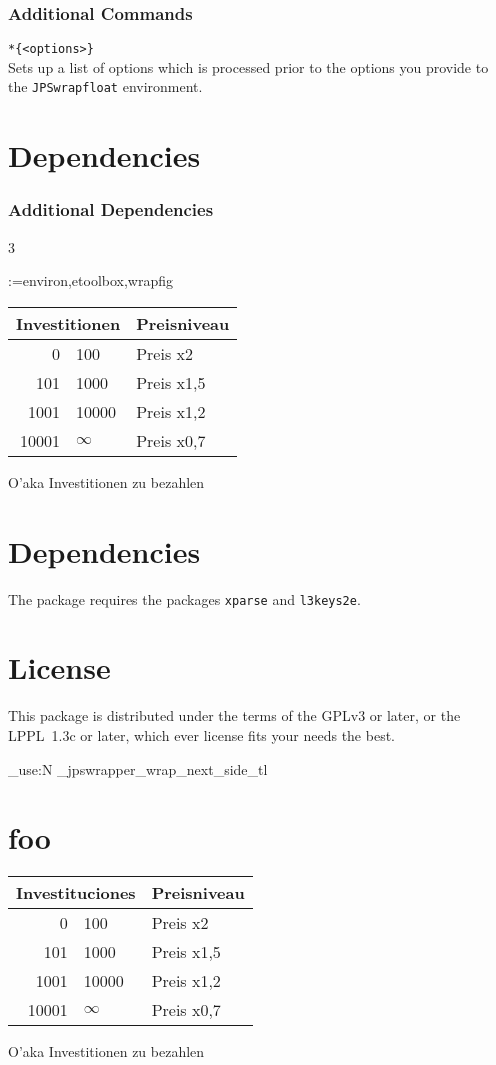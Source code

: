 \documentclass[a4paper,10pt]{scrartcl}
\makeatletter
\newenvironment{codedescription*}{%
  \parindent=-3em
  \parskip=1em plus 2pt minus 2pt
  \vspace*{-0.7em}\hspace*{\parindent}\ignorespaces
}{\par}
\newcommand*\dependencies[2][3]{%
  \@ifstar
    {\section{Dependencies}}
    {\subsubsection{Additional Dependencies}}%
  \begin{multicols}{#1}
    \begin{itemize}%
      \@for\cs:={#2}\do{%
        \item\texttt{\cs}}%
    \end{itemize}%
  \end{multicols}}%
\makeatother
\begin{document}
\subsubsection{Additional Commands}
\begin{codedescription*}
\texttt{\string\JPSwrapfloatUserDefaults\textit{*}\{<options>\}}\\
  Sets up a list of options which is processed prior to the options you provide
  to the \texttt{JPSwrapfloat} environment.
\end{codedescription*}

\dependencies{environ,etoolbox,wrapfig}

\begin{JPSwrapfloat}[lines=6,r]
  \centering
  \begin{tabular}{r@{\,-\,}ll}
      \toprule
      \multicolumn{2}{c}{Investitionen} & Preisniveau\\
      \midrule
      0 & 100 & Preis x2\\
      101 & 1000 & Preis x1,5\\
      1001 & 10000 & Preis x1,2\\
      10001 & $\infty$ & Preis x0,7\\
      \bottomrule
  \end{tabular}
  \caption[foo]{O'aka Investitionen zu bezahlen}
\end{JPSwrapfloat}
\section{Dependencies}
The package requires the packages \texttt{xparse} and \texttt{l3keys2e}.

\section{License}
This package is distributed under the terms of the GPLv3 or later, or the
LPPL~1.3c or later, which ever license fits your needs the best.

\ExplSyntaxOn
\tl_use:N \g_jpswrapper_wrap_next_side_tl
\ExplSyntaxOff
\section{foo}
\begin{JPSwrapfloat}
  \centering
  \begin{tabular}{r@{\,-\,}ll}
      \toprule
      \multicolumn{2}{c}{Investituciones} & Preisniveau\\
      \midrule
      0 & 100 & Preis x2\\
      101 & 1000 & Preis x1,5\\
      1001 & 10000 & Preis x1,2\\
      10001 & $\infty$ & Preis x0,7\\
      \bottomrule
  \end{tabular}
  \caption[foo]{O'aka Investitionen zu bezahlen}
\end{JPSwrapfloat}

\blindtext
\end{document}
